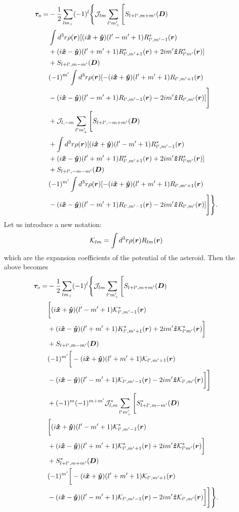 \documentclass[aps,twocolumn,secnumarabic,balancelastpage,amsmath,amssymb,nofootinbib,floatfix]{revtex4-1}
\begin{document}
\begin{equation*}
\begin{aligned}
\bm \tau_o = &-\frac{1}{2}\sum_{lm_+}(-1)^l \Bigg\{\mathcal{J}_{lm}\sum_{l'm'_+} \Bigg[S_{l+l',m+m'}(\bm D) \\
&\int d^3 r \rho(\bm r) [(i\bm{\hat x} + \bm{\hat y})(l'-m'+1)R^*_{l',m'-1}(\bm r)\\
&+(i\bm{\hat x}-\bm{\hat y})(l'+m'+1)R^*_{l',m'+1}(\bm r)+2im'\bm{\hat z} R^*_{l'm'}(\bm r)]\\
&+S_{l+l',m-m'}(\bm D) \\
&(-1)^{m'}\int d^3 r \rho(\bm r) [-(i\bm{\hat x} + \bm{\hat y})(l'+m'+1)R_{l',m'+1}(\bm r)\\
&-(i\bm{\hat x}-\bm{\hat y})(l'-m'+1)R_{l',m'-1}(\bm r)-2im'\bm{\hat z} R_{l',m'}(\bm r)]\Bigg]\\
&+ \mathcal{J}_{l,-m}\sum_{l'm'_+} \Bigg[S_{l+l',-m+m'}(\bm D) \\
&+\int d^3 r \rho(\bm r) [(i\bm{\hat x} + \bm{\hat y})(l'-m'+1)R^*_{l',m'-1}(\bm r)\\
&+(i\bm{\hat x}-\bm{\hat y})(l'+m'+1)R^*_{l',m'+1}(\bm r)+2im'\bm{\hat z} R^*_{l'm'}(\bm r)]\\
&+S_{l+l',-m-m'}(\bm D) \\
&(-1)^{m'}\int d^3 r \rho(\bm r) [-(i\bm{\hat x} + \bm{\hat y})(l'+m'+1)R_{l',m'+1}(\bm r)\\
&-(i\bm{\hat x}-\bm{\hat y})(l'-m'+1)R_{l',m'-1}(\bm r)-2im'\bm{\hat z} R_{l',m'}(\bm r)]\Bigg]\Bigg\}.
\end{aligned}
\end{equation*}
Let us introduce a new notation:
\begin{equation}
\mathcal{K}_{lm} = \int d^3 r \rho(\bm r) R_{lm} (\bm r)
\label{eqn:klm-def}
\end{equation}
which are the expansion coefficients of the potential of the asteroid. Then the above becomes
\begin{equation*}
\begin{aligned}
\bm \tau_o = &-\frac{1}{2}\sum_{lm_+}(-1)^l \Bigg\{\mathcal{J}_{lm}\sum_{l'm'_+} \Bigg[S_{l+l',m+m'}(\bm D) \\
&\bigg[(i\bm{\hat x} + \bm{\hat y})(l'-m'+1)\mathcal{K}^*_{l',m'-1}(\bm r)\\
&+(i\bm{\hat x}-\bm{\hat y})(l'+m'+1)K^*_{l',m'+1}(\bm r)+2im'\bm{\hat z} \mathcal{K}^*_{l'm'}(\bm r)\bigg]\\
&+S_{l+l',m-m'}(\bm D) \\
&(-1)^{m'}\bigg[-(i\bm{\hat x} + \bm{\hat y})(l'+m'+1)\mathcal{K}_{l',m'+1}(\bm r)\\
&-(i\bm{\hat x}-\bm{\hat y})(l'-m'+1)\mathcal{K}_{l',m'-1}(\bm r)-2im'\bm{\hat z} \mathcal{K}_{l',m'}(\bm r)\bigg]\Bigg]\\
&+ (-1)^m (-1)^{m+m'}\mathcal{J}_{l,m}^*\sum_{l'm'_+} \Bigg[S^*_{l+l',m-m'}(\bm D) \\
&\bigg[(i\bm{\hat x} + \bm{\hat y})(l'-m'+1)\mathcal{K}^*_{l',m'-1}(\bm r)\\
&+(i\bm{\hat x}-\bm{\hat y})(l'+m'+1)\mathcal{K}^*_{l',m'+1}(\bm r)+2im'\bm{\hat z} \mathcal{K}^*_{l'm'}(\bm r)\bigg]\\
&+S^*_{l+l',m+m'}(\bm D) \\
&(-1)^{m'}\bigg[-(i\bm{\hat x} + \bm{\hat y})(l'+m'+1)\mathcal{K}_{l',m'+1}(\bm r)\\
&-(i\bm{\hat x}-\bm{\hat y})(l'-m'+1)\mathcal{K}_{l',m'-1}(\bm r)-2im'\bm{\hat z} \mathcal{K}_{l',m'}(\bm r)\bigg]\Bigg]\Bigg\}.
\end{aligned}
\end{equation*}
\end{document}
